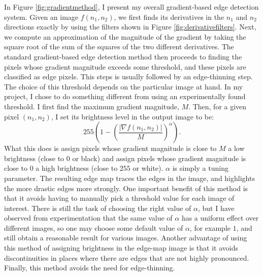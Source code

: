 \documentclass[12pt]{amsart}
\begin{document}
In Figure \ref{fig:gradientmethod}, I present my overall gradient-based edge detection system. Given an image $f(n_1, n_2)$, we first finds its derivatives in the $n_1$ and $n_2$ directions exactly by using the filters shown in Figure \ref{fig:derivativefilters}. Next, we compute an approximation of the magnitude of the gradient by taking the square root of the sum of the squares of the two different derivatives. The standard gradient-based edge detection method then proceeds to finding the pixels whose gradient magnitude exceeds some threshold, and these pixels are classified as edge pixels. This steps is usually followed by an edge-thinning step. The choice of this threshold depends on the particular image at hand. In my project, I chose to do something different from using an experimentally found threshold. I first find the maximum gradient magnitude, $M$. Then, for a given pixel $(n_1, n_2)$, I set its brightness level in the output image to be:
\begin{equation*}
255 \left(1 - \left(\frac{|\nabla f(n_1, n_2)|}{M}\right)^\alpha\right).
\end{equation*}
What this does is assign pixels whose gradient magnitude is close to $M$ a low brightness (close to $0$ or black) and assign pixels whose gradient magnitude is close to $0$ a high brightness (close to $255$ or white). $\alpha$ is simply a tuning parameter. The resulting edge map traces the edges in the image, and highlights the more drastic edges more strongly. One important benefit of this method is that it avoids having to manually pick a threshold value for each image of interest. There is still the task of choosing the right value of $\alpha$, but I have observed from experimentation that the same value of $\alpha$ has a uniform effect over different images, so one may choose some default value of $\alpha$, for example $1$, and still obtain a reasonable result for various images. Another advantage of using this method of assigning brightness in the edge-map image is that it avoids discontinuities in places where there are edges that are not highly pronounced. Finally, this method avoids the need for edge-thinning.
\end{document}
